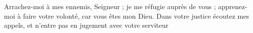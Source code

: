 Arrachez-moi à mes ennemis, Seigneur ; je me réfugie auprès de vous ; apprenez-moi à faire votre volonté, car vous êtes mon Dieu.
\versseparator
Dans votre justice écoutez mes appels, et n'entre pas en jugement avec votre serviteur
